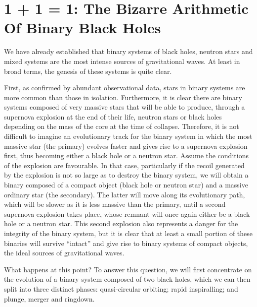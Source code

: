 \section{1 + 1 = 1: The Bizarre Arithmetic Of Binary Black Holes}\label{sec:08-merger}

We have already established that binary systems of black holes,
neutron stars and mixed systems are the most intense sources of gravitational waves. At
least in broad terms, the genesis of these systems is quite clear.

First, as confirmed by abundant observational data, stars in binary systems are more
common than those in isolation. Furthermore, it is clear there are binary systems
composed of very massive stars that will be able to produce, through a supernova
explosion at the end of their life, neutron stars or black holes depending on the mass
of the core at the time of collapse. Therefore, it is not difficult to imagine an
evolutionary track for the binary system in which the most massive star (the primary)
evolves faster and gives rise to a supernova explosion first, thus becoming either a
black hole or a neutron star. Assume the conditions of the explosion are favourable. In
that case, particularly if the recoil generated by the explosion is not so large as to
destroy the binary system, we will obtain a binary composed of a compact object (black
hole or neutron star) and a massive ordinary star (the secondary). The latter will move
along its evolutionary path, which will be slower as it is less massive than the
primary, until a second supernova explosion takes place, whose remnant will once again
either be a black hole or a neutron star. This second explosion also represents a danger
for the integrity of the binary system, but it is clear that at least a small portion of
these binaries will survive ``intact'' and give rise to binary systems of compact
objects, the ideal sources of gravitational waves.

What happens at this point? To answer this question, we will first concentrate on the
evolution of a binary system composed of two black holes, which we can then split into
three distinct phases: quasi-circular orbiting; rapid inspiralling; and plunge, merger
and ringdown.

